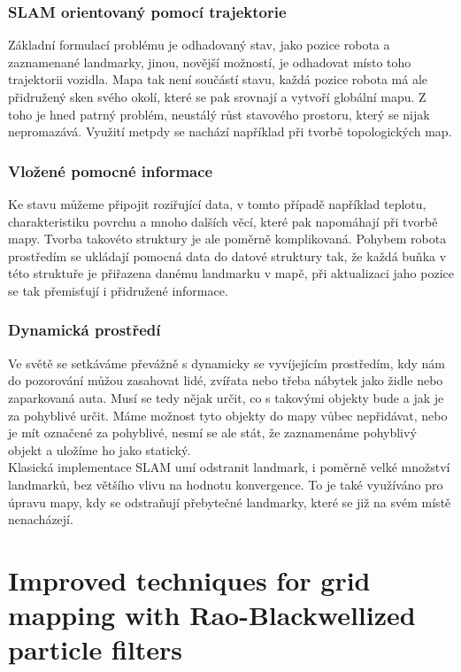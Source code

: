 \documentclass[11pt]{article}
\begin{document}
\subsubsection{SLAM orientovaný pomocí trajektorie}
Základní formulací problému je odhadovaný stav, jako pozice robota a zaznamenané landmarky, jinou, novější možností, je odhadovat místo toho trajektorii vozidla. Mapa tak není součástí stavu, každá pozice robota má ale přidružený sken svého okolí, které se pak srovnají a vytvoří globální mapu. Z toho je hned patrný problém, neustálý růst stavového prostoru, který se nijak nepromazává. Využití metpdy se nachází například při tvorbě topologických map.

\subsubsection{Vložené pomocné informace}
Ke stavu můžeme připojit roziřující data, v tomto případě například teplotu, charakteristiku povrchu a mnoho dalších věcí, které pak napomáhají při tvorbě mapy. Tvorba takovéto struktury je ale poměrně komplikovaná. Pohybem robota prostředím se ukládají pomocná data do datové struktury tak, že každá buňka v této struktuře je přiřazena danému landmarku v mapě, při aktualizaci jaho pozice se tak přemisťují i přidružené informace. 

\subsubsection{Dynamická prostředí}
Ve světě se setkáváme převážně s dynamicky se vyvíjejícím prostředím, kdy nám do pozorování můžou zasahovat lidé, zvířata nebo třeba nábytek jako židle nebo zaparkovaná auta. Musí se tedy nějak určit, co s takovými objekty bude a jak je za pohyblivé určit. Máme možnost tyto objekty do mapy vůbec nepřidávat, nebo je mít označené za pohyblivé, nesmí se ale stát, že zaznamenáme pohyblivý objekt a uložíme ho jako statický. \\
\indent Klasická implementace SLAM umí odstranit landmark, i poměrně velké množství landmarků, bez většího vlivu na hodnotu konvergence. To je také využíváno pro úpravu mapy, kdy se odstraňují přebytečné landmarky, které se již na svém místě nenacházejí. 

\newpage

\section{Improved techniques for grid mapping with Rao-Blackwellized particle filters}
\end{document}
